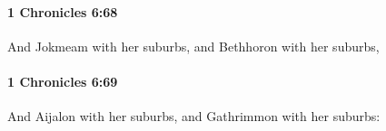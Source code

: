 		\paragraph{1 Chronicles 6:68} %
			\label{1CHRONICLES-6-68}

			And Jokmeam with her suburbs, and Bethhoron with her suburbs,


		\paragraph{1 Chronicles 6:69} %
			\label{1CHRONICLES-6-69}

			And Aijalon with her suburbs, and Gathrimmon with her suburbs:


